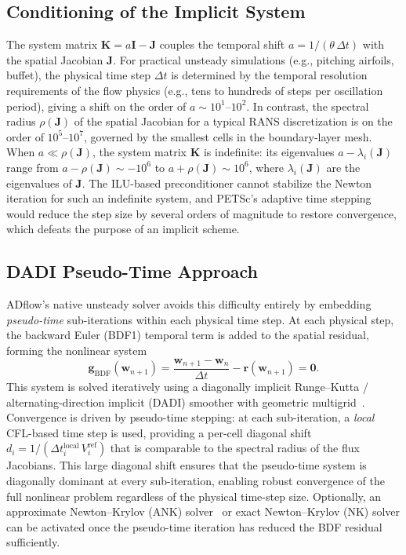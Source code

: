 \documentclass[journal]{new-aiaa}
\newcommand{\mb}[1]{\mathbf{#1}}
\begin{document}
\subsection{Conditioning of the Implicit System}\label{sec:conditioning}
The system matrix $\mb{K} = a\mb{I} - \mb{J}$ couples the temporal shift $a = 1/(\theta \, \Delta t)$ with the spatial Jacobian $\mb{J}$.
For practical unsteady simulations (e.g., pitching airfoils, buffet), the physical time step $\Delta t$ is determined by the temporal resolution requirements of the flow physics (e.g., tens to hundreds of steps per oscillation period), giving a shift on the order of $a \sim 10^1$--$10^2$.
In contrast, the spectral radius $\rho(\mb{J})$ of the spatial Jacobian for a typical RANS discretization is on the order of $10^5$--$10^7$, governed by the smallest cells in the boundary-layer mesh.
When $a \ll \rho(\mb{J})$, the system matrix $\mb{K}$ is indefinite: its eigenvalues $a - \lambda_i(\mb{J})$ range from $a - \rho(\mb{J}) \sim -10^6$ to $a + \rho(\mb{J}) \sim 10^6$, where $\lambda_i(\mb{J})$ are the eigenvalues of $\mb{J}$.
The ILU-based preconditioner cannot stabilize the Newton iteration for such an indefinite system, and PETSc's adaptive time stepping would reduce the step size by several orders of magnitude to restore convergence, which defeats the purpose of an implicit scheme.

\subsection{DADI Pseudo-Time Approach}\label{sec:dadi}
ADflow's native unsteady solver avoids this difficulty entirely by embedding \emph{pseudo-time} sub-iterations within each physical time step.
At each physical step, the backward Euler (BDF1) temporal term is added to the spatial residual, forming the nonlinear system
\begin{equation}\label{eq:bdf1_system}
\mb{g}_{\text{BDF}}(\mb{w}_{n+1}) = \frac{\mb{w}_{n+1} - \mb{w}_n}{\Delta t} - \mb{r}(\mb{w}_{n+1}) = \mb{0}.
\end{equation}
This system is solved iteratively using a diagonally implicit Runge--Kutta / alternating-direction implicit (DADI) smoother with geometric multigrid~\cite{VanLeer2009}.
Convergence is driven by pseudo-time stepping: at each sub-iteration, a \emph{local} CFL-based time step is used, providing a per-cell diagonal shift $d_i = 1/(\Delta t_i^{\text{local}} \, V_i^{\text{ref}})$ that is comparable to the spectral radius of the flux Jacobians.
This large diagonal shift ensures that the pseudo-time system is diagonally dominant at every sub-iteration, enabling robust convergence of the full nonlinear problem regardless of the physical time-step size.
Optionally, an approximate Newton--Krylov (ANK) solver~\cite{Yildirim2019} or exact Newton--Krylov (NK) solver can be activated once the pseudo-time iteration has reduced the BDF residual sufficiently.
\end{document}
